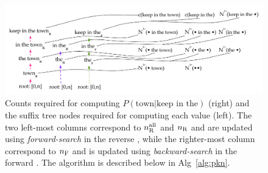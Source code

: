 \begin{figure}[p]
\includegraphics[width=\textwidth]{figures/kn_dual_cst}
\vspace{-3ex}
\caption{Counts required for computing $P(\text{town} | \text{keep in the})$ (right) and the suffix tree nodes required for computing each value (left). The two left-most columns correspond to $n_{\text{R}}^{\text{all}}$ and $n_{\text{R}}$ and are updated using \emph{forward-search} in the reverse \CST, while the righter-most column correspond to $n_{\text{F}}$ and is updated using \emph{backward-search} in the forward \CST. The algorithm is described below in Alg~\ref{alg:pkn}.}
\label{fig-counts-example}
\end{figure}

